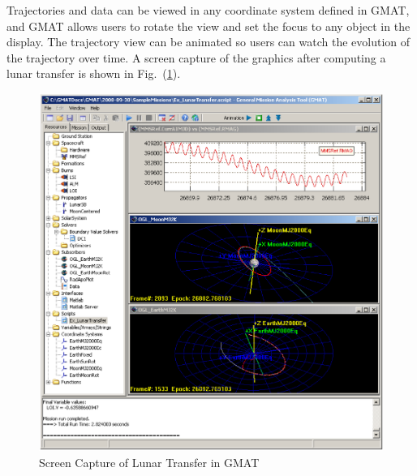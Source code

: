 Trajectories and data can be viewed in any coordinate system defined in GMAT, and GMAT allows users to rotate the view and set the focus to any object in the display.  The trajectory view can be animated so users can watch the evolution of the trajectory over time.  A screen capture of the graphics after computing a lunar transfer is shown in Fig.~(\ref{fig:LunarScreenCapture}).
%
\begin{figure}[tb]
\begin{center}
\includegraphics*[scale=0.225]{Images/LunarTransferScreenShot.eps}
\caption{\label{fig:LunarScreenCapture} Screen Capture of Lunar Transfer in GMAT}
\end{center}
\end{figure}

